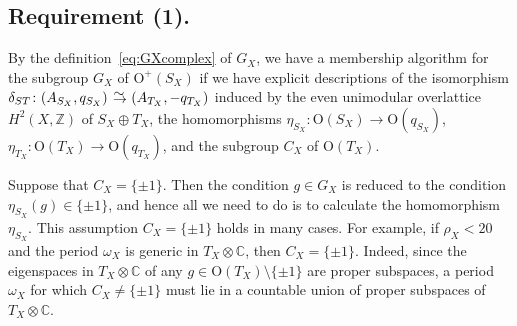 \documentclass{amsart}
\theoremstyle{plain}
\theoremstyle{definition}
\theoremstyle{remark}
\numberwithin{equation}{section}
\numberwithin{table}{section}
\numberwithin{figure}{section}
\newcommand{\C}{\mathord{\mathbb C}}
\newcommand{\Z}{\mathord{\mathbb Z}}
\newcommand{\isom}{\mathbin{\,\raise -.6pt\rlap{$\to$}\raise 3.5pt \hbox{\hskip .3pt$\mathord{\sim}$}\;}}
\newcommand{\tensor}{\otimes}
\newcommand{\OG}{\mathord{\mathrm {O}}}
\begin{document}
\subsection{Requirement (1).}\label{subsec:req1}
%
By the definition~\eqref{eq:GXcomplex} of $G_X$,
we have a membership algorithm for the subgroup $G_X$ of $\OG^+(S_X)$
if we have explicit descriptions of 
the isomorphism $\delta_{ST}\colon (A_{S_X}, q_{S_X})\isom (A_{T_X}, -q_{T_X})$
induced by the even unimodular overlattice $H^2(X, \Z)$ of $S_X\oplus T_X$,
the homomorphisms 
$\eta_{S_X}\colon \OG(S_X)\to \OG(q_{S_X})$, $\eta_{T_X}\colon \OG(T_X)\to \OG(q_{T_X})$,
and the subgroup $C_X$ of $\OG(T_X)$.
\par
Suppose that $C_X=\{\pm 1\}$.
Then the condition $g\in G_X$ is reduced to the condition $\eta_{S_X}(g)\in\{\pm 1\}$,
and hence all we need to do is to calculate 
the homomorphism $\eta_{S_X}$.
This assumption $C_X=\{\pm 1\}$
holds in many cases.
For example, if  $\rho_X<20$
and the period $\omega_X$ is generic in $T_X\tensor \C$,  then $C_X=\{\pm 1\}$.
Indeed, since the eigenspaces in  $T_X\tensor\C$  of any $g\in \OG(T_X)\setminus \{\pm 1\}$ are proper subspaces,
 a period $\omega_X$ for which $C_X\ne \{\pm 1\}$ must lie in a countable union of proper subspaces of $T_X\tensor\C$.
%
\end{document}
